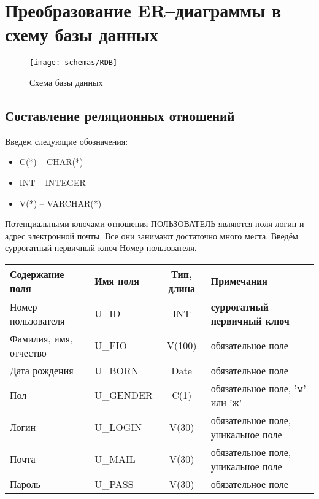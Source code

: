 \documentclass[a4paper,14pt]{article}
\begin{document}
\section{Преобразование ER–диаграммы в схему базы данных}

\begin{figure}[H]
	\centering		
	\texttt{[image: schemas/RDB]}
	\caption{Схема базы данных}\label{img:RDB}
\end{figure}

\subsection{Составление реляционных отношений}

Введем следующие обозначения:

\begin{itemize}
	\item C(*) -- CHAR(*)
	\item INT -- INTEGER
	\item V(*) -- VARCHAR(*)
\end{itemize}



Потенциальными ключами отношения ПОЛЬЗОВАТЕЛЬ являются поля логин и адрес электронной почты. Все они занимают достаточно много места. Введём суррогатный первичный ключ Номер пользователя.

\begin{table}[H]
	\begin{flushleft} 
	\end{flushleft}
\begin{adjustbox}{width=\linewidth}
\begin{tabular}{|l|l|c|l|}
	\hline
	Содержание поля        & Имя поля  & Тип, длина & Примечания                          \\ \hline
	Номер пользователя     & U\_ID     &    INT    & \textbf{суррогатный первичный ключ} \\ \hline
	Фамилия, имя, отчество & U\_FIO    &   V(100)   & обязательное поле                   \\ \hline
	Дата рождения          & U\_BORN   &    Date    & обязательное поле                   \\ \hline
	Пол                    & U\_GENDER &    C(1)    & обязательное поле, 'м' или 'ж'      \\ \hline
	Логин                  & U\_LOGIN  &   V(30)    & обязательное поле, уникальное поле  \\ \hline
	Почта                  & U\_MAIL   &   V(30)    & обязательное поле, уникальное поле  \\ \hline
	Пароль                 & U\_PASS   &   V(30)    & обязательное поле                   \\ \hline
\end{tabular}
\end{adjustbox}
\end{table}
\end{document}
